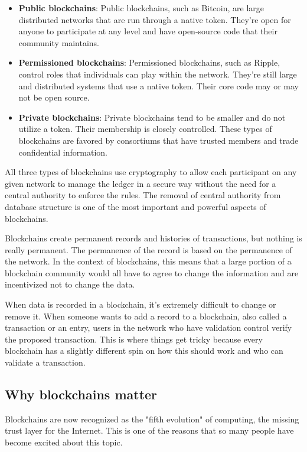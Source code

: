\documentclass[MSE,Master,english]{twbook}%
\begin{document}
\begin{itemize}
  \item \textbf{Public blockchains}: Public blockchains, such as Bitcoin, are large distributed networks that are run through a native token. They're open for anyone to participate at any level and have open-source code that their community maintains.
  \item \textbf{Permissioned blockchains}: Permissioned blockchains, such as Ripple, control roles that individuals can play within the network. They're still large and distributed systems that use a native token. Their core code may or may not be open source.
  \item \textbf{Private blockchains}: Private blockchains tend to be smaller and do not utilize a token. Their membership is closely controlled. These types of blockchains are favored by consortiums that have trusted members and trade confidential information.
\end{itemize}

All three types of blockchains use cryptography to allow each participant on any given network to manage the ledger in a secure way without the need for a central authority to enforce the rules. The removal of central authority from database structure is one of the most important and powerful aspects of blockchains.

Blockchains create permanent records and histories of transactions, but nothing is really permanent. The permanence of the record is based on the permanence of the network. In the context of blockchains, this means that a large portion of a blockchain community would all have to agree to change the information and are incentivized not to change the data. 

When data is recorded in a blockchain, it's extremely difficult to change or remove it. When someone wants to add a record to a blockchain, also called a transaction or an entry, users in the network who have validation control verify the proposed transaction. This is where things get tricky because every blockchain has a slightly different spin on how this should work and who can validate a transaction.

\subsection{Why blockchains matter}

Blockchains are now recognized as the "fifth evolution"\cite{blockchainDummies} of computing, the missing trust layer for the Internet. This is one of the reasons that so many people have become excited about this topic. 
\end{document}
